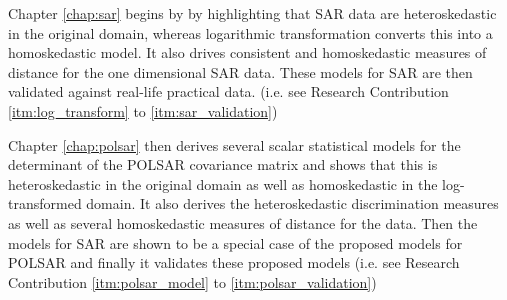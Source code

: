 


                Chapter \ref{chap:sar} begins by by highlighting that SAR
                data are heteroskedastic in the original domain, whereas
                logarithmic transformation converts this into a
                homoskedastic model. 
It
                also drives consistent and homoskedastic measures of
                distance for the one dimensional SAR data.
These
                models for SAR are then validated against real-life
                practical data. (i.e. see Research Contribution \ref{itm:log_transform} to \ref{itm:sar_validation})

 Chapter
                \ref{chap:polsar} then derives several scalar statistical models for the
                determinant of the POLSAR covariance matrix and
                shows that this is heteroskedastic in the original
                domain as well as homoskedastic in the log-transformed
                domain.
It
                also derives the heteroskedastic discrimination measures
                 as well as several homoskedastic measures of
                distance for the data.
Then
                the models for SAR are shown to be a special case of
                the proposed models for POLSAR and finally it
                validates these proposed models (i.e. see Research Contribution \ref{itm:polsar_model} to \ref{itm:polsar_validation})

